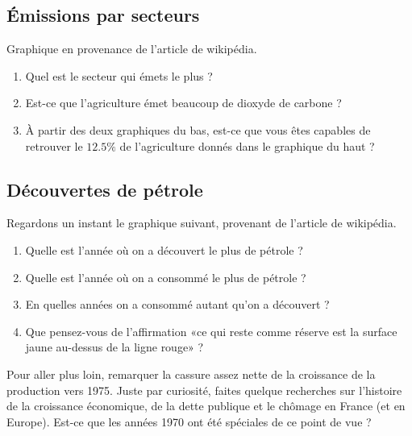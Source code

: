 \subsection{Émissions par secteurs}

Graphique en provenance de l'article  de wikipédia.

\begin{enumerate}
    \item
        Quel est le secteur qui émets le plus ?
    \item
        Est-ce que l'agriculture émet beaucoup de dioxyde de carbone ?
    \item
        À partir des deux graphiques du bas, est-ce que vous êtes capables de retrouver le \( 12.5\%\) de l'agriculture donnés dans le graphique du haut ?
\end{enumerate}

\subsection{Découvertes de pétrole}

Regardons un instant le graphique suivant, provenant de l'article  de wikipédia.


\begin{enumerate}
    \item
        Quelle est l'année où on a découvert le plus de pétrole ?
    \item
        Quelle est l'année où on a consommé le plus de pétrole ?
    \item
        En quelles années on a consommé autant qu'on a découvert ?
    \item
        Que pensez-vous de l'affirmation «ce qui reste comme réserve est la surface jaune au-dessus de la ligne rouge» ?
\end{enumerate}
Pour aller plus loin, remarquer la cassure assez nette de la croissance de la production vers 1975. Juste par curiosité, faites quelque recherches sur l'histoire de la croissance économique, de la dette publique et le chômage en France (et en Europe). Est-ce que les années 1970 ont été spéciales de ce point de vue ?

